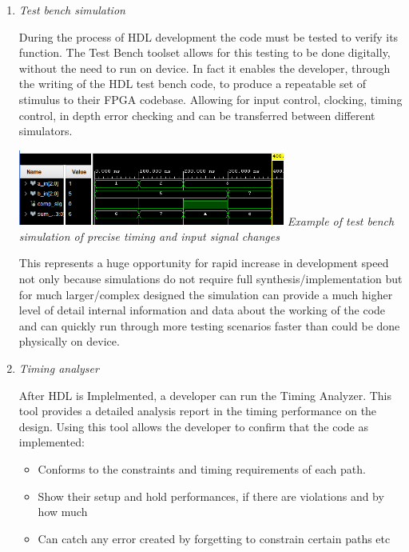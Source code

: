 \documentclass[11pt]{article}
\begin{document}
\begin{preview}
\begin{enumerate}
\begin{enumerate}
        \item \textit{Test bench simulation}

        During the process of HDL development the code must be tested to verify its function. The Test Bench toolset allows for this testing to be done digitally, without the need to run on device. In fact it enables the developer, through the writing of the HDL test bench code, to produce a repeatable set of stimulus to their FPGA codebase. Allowing for input control, clocking, timing control, in depth error checking and can be transferred between different simulators. 
        
        \begin{center}
            \includegraphics[width=0.69\textwidth]{inc/sim.png}
            \textit{Example of test bench simulation of precise timing and input signal changes}
        \end{center}

        This represents a huge opportunity for rapid increase in development speed not only because simulations do not require full synthesis/implementation but for much larger/complex designed the simulation can provide a much higher level of detail internal information and data about the working of the code and can quickly run through more testing scenarios faster than could be done physically on device.

        \item \textit{Timing analyser}
        
        After HDL is Implelmented, a developer can run the Timing Analyzer. This tool provides a detailed analysis report in the timing performance on the design. Using this tool allows the developer to confirm that the code as implemented:
        \begin{itemize}
            \item Conforms to the constraints and timing requirements of each path.
            \item Show their setup and hold performances, if there are violations and by how much
            \item Can catch any error created by forgetting to constrain certain paths etc 
        \end{itemize}


\end{enumerate}
\end{enumerate}
\end{preview}
\end{document}
